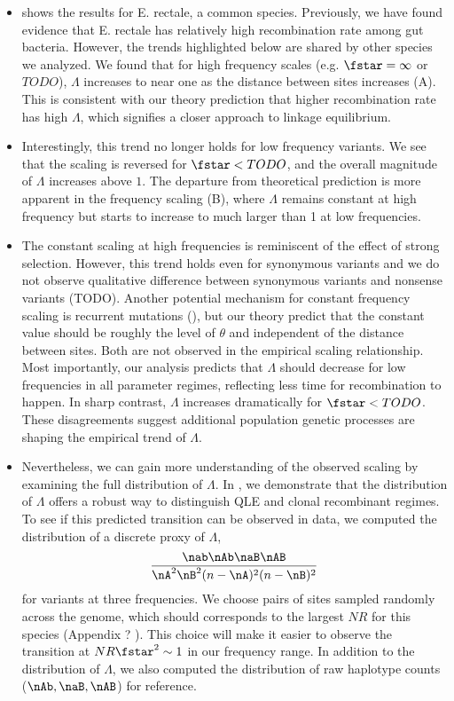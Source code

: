 \documentclass[aps,rmp,twocolumn,groupedaddress,floatfix,notitlepage]{revtex4-1}
\begin{document}
\begin{itemize}
    \item {} shows the results for E. rectale, a common species. Previously, we have found evidence that E. rectale has relatively high recombination rate among gut bacteria. However, the trends highlighted below  are shared by other species we analyzed. We found that for high frequency scales (e.g. $\fstar=\infty$ or $TODO$), $\Lambda$ increases to near one as the distance between sites increases (A). This is consistent with our theory prediction that higher recombination rate has high $\Lambda$, which signifies a closer approach to linkage equilibrium.
    
    \item Interestingly, this trend no longer holds for low frequency variants. We see that the scaling is reversed for $\fstar < TODO$, and the overall magnitude of $\Lambda$ increases above $1$. The departure from theoretical prediction is more apparent in the frequency scaling (B), where $\Lambda$ remains constant at high frequency but starts to increase to much larger than 1 at low frequencies.
    
    \item The constant scaling at high frequencies is reminiscent of the effect of strong selection. However, this trend holds even for synonymous variants and we do not observe qualitative difference between synonymous variants and nonsense variants (TODO). Another potential mechanism for constant frequency scaling is recurrent mutations (), but our theory predict that the constant value should be roughly the level of $\theta$ and independent of the distance between sites. Both are not observed in the empirical scaling relationship. Most importantly, our analysis predicts that $\Lambda$ should decrease for low frequencies in all parameter regimes, reflecting less time for recombination to happen. In sharp contrast, $\Lambda$ increases dramatically for $\fstar < TODO$. These disagreements suggest additional population genetic processes are shaping the empirical trend of $\Lambda$.
    
    \item Nevertheless, we can gain more understanding of the observed scaling by examining the full distribution of $\Lambda$. In \secref{}, we demonstrate that the distribution of $\Lambda$ offers a robust way to distinguish QLE and clonal recombinant regimes. To see if this predicted transition can be observed in data, we computed the distribution of a discrete proxy of $\Lambda$, 
    \begin{align}
    \frac{\nab \nAb \naB \nAB}{\nA^2 \nB^2(n-\nA)^2(n-\nB)^2}
    \end{align}
    for variants at three frequencies. We choose pairs of sites sampled randomly across the genome, which should corresponds to the largest $NR$ for this species (Appendix ? ). This choice will make it easier to observe the transition at $NR\fstar^2\sim1$ in our frequency range. In addition to the distribution of $\Lambda$, we also computed the distribution of raw haplotype counts ($\nAb, \naB, \nAB$) for reference.
    

\end{itemize}
\end{document}

